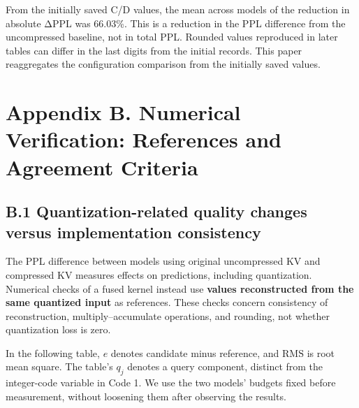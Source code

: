 \documentclass[10pt,a4paper]{article}
\begin{document}
From the initially saved C/D values, the mean across models of the reduction in absolute ΔPPL was 66.03\%. This is a reduction in the PPL difference from the uncompressed baseline, not in total PPL. Rounded values reproduced in later tables can differ in the last digits from the initial records. This paper reaggregates the configuration comparison from the initially saved values.

\section{Appendix B. Numerical Verification: References and Agreement Criteria}\label{appendix-b.-numerical-verification-references-and-agreement-criteria}

\subsection{B.1 Quantization-related quality changes versus implementation consistency}\label{b.1-quantization-related-quality-changes-versus-implementation-consistency}

The PPL difference between models using original uncompressed KV and compressed KV measures effects on predictions, including quantization. Numerical checks of a fused kernel instead use \textbf{values reconstructed from the same quantized input} as references. These checks concern consistency of reconstruction, multiply--accumulate operations, and rounding, not whether quantization loss is zero.

In the following table, \(e\) denotes candidate minus reference, and \(\mathrm{RMS}\) is root mean square. The table's \(q_j\) denotes a query component, distinct from the integer-code variable \texttt{} in Code 1. We use the two models' budgets fixed before measurement, without loosening them after observing the results.
\end{document}
